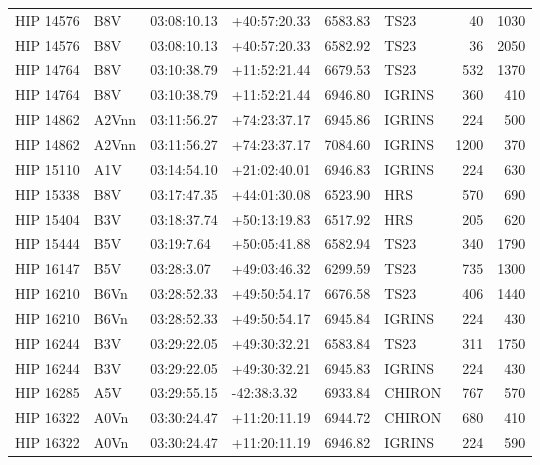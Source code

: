 \documentclass{emulateapj}
\begin{document}
\begin{longtable*}{|l|lllrlrr|}
   HIP 14576 &            B8V &    03:08:10.13 &   +40:57:20.33 &  6583.83 &       TS23 &       40 &    1030 \\
   HIP 14576 &            B8V &    03:08:10.13 &   +40:57:20.33 &  6582.92 &       TS23 &       36 &    2050 \\
   HIP 14764 &            B8V &    03:10:38.79 &   +11:52:21.44 &  6679.53 &       TS23 &      532 &    1370 \\
   HIP 14764 &            B8V &    03:10:38.79 &   +11:52:21.44 &  6946.80 &     IGRINS &      360 &     410 \\
   HIP 14862 &          A2Vnn &    03:11:56.27 &   +74:23:37.17 &  6945.86 &     IGRINS &      224 &     500 \\
   HIP 14862 &          A2Vnn &    03:11:56.27 &   +74:23:37.17 &  7084.60 &     IGRINS &     1200 &     370 \\
   HIP 15110 &            A1V &    03:14:54.10 &   +21:02:40.01 &  6946.83 &     IGRINS &      224 &     630 \\
   HIP 15338 &            B8V &    03:17:47.35 &   +44:01:30.08 &  6523.90 &        HRS &      570 &     690 \\
   HIP 15404 &            B3V &    03:18:37.74 &   +50:13:19.83 &  6517.92 &        HRS &      205 &     620 \\
   HIP 15444 &            B5V &     03:19:7.64 &   +50:05:41.88 &  6582.94 &       TS23 &      340 &    1790 \\
   HIP 16147 &            B5V &     03:28:3.07 &   +49:03:46.32 &  6299.59 &       TS23 &      735 &    1300 \\
   HIP 16210 &           B6Vn &    03:28:52.33 &   +49:50:54.17 &  6676.58 &       TS23 &      406 &    1440 \\
   HIP 16210 &           B6Vn &    03:28:52.33 &   +49:50:54.17 &  6945.84 &     IGRINS &      224 &     430 \\
   HIP 16244 &            B3V &    03:29:22.05 &   +49:30:32.21 &  6583.84 &       TS23 &      311 &    1750 \\
   HIP 16244 &            B3V &    03:29:22.05 &   +49:30:32.21 &  6945.83 &     IGRINS &      224 &     430 \\
   HIP 16285 &            A5V &    03:29:55.15 &    -42:38:3.32 &  6933.84 &     CHIRON &      767 &     570 \\
   HIP 16322 &           A0Vn &    03:30:24.47 &   +11:20:11.19 &  6944.72 &     CHIRON &      680 &     410 \\
   HIP 16322 &           A0Vn &    03:30:24.47 &   +11:20:11.19 &  6946.82 &     IGRINS &      224 &     590 \\

\end{longtable*}
\end{document}
